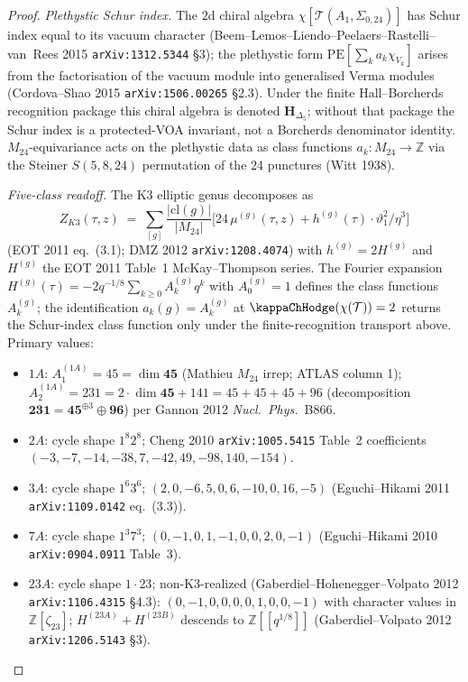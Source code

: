 \begin{proof}%
\emph{Plethystic Schur index.} The $2$d chiral algebra
$\chi[\mathcal T(A_1, \Sigma_{0, 24})]$ has Schur index equal to its
vacuum character
(Beem--Lemos--Liendo--Peelaers--Rastelli--van~Rees 2015
\texttt{arXiv:1312.5344} \S 3); the plethystic form
$\mathrm{PE}[\sum_k a_k \chi_{V_k}]$ arises from the
factorisation of the vacuum module into generalised Verma
modules (Cordova--Shao 2015 \texttt{arXiv:1506.00265} \S 2.3).
Under the finite Hall--Borcherds recognition package this chiral
algebra is denoted $\mathbf H_{\Delta_5}$; without that package the
Schur index is a protected-VOA invariant, not a Borcherds denominator
identity.
$M_{24}$-equivariance acts on the plethystic data as class
functions $a_k\colon M_{24} \to \mathbb Z$ via the Steiner
$S(5, 8, 24)$ permutation of the $24$ punctures (Witt 1938).

\emph{Five-class readoff.} The K3 elliptic genus decomposes as
\[
 Z_{K3}(\tau, z)
 \;=\; \sum_{[g]} \frac{|\mathrm{cl}(g)|}{|M_{24}|}
 \bigl[24\, \mu^{(g)}(\tau, z) + h^{(g)}(\tau) \cdot
 \vartheta_1^2 / \eta^3\bigr]
\]
(EOT 2011 eq.~(3.1); DMZ 2012 \texttt{arXiv:1208.4074}) with
$h^{(g)} = 2 H^{(g)}$ and $H^{(g)}$ the EOT 2011 Table~1
McKay--Thompson series. The Fourier expansion
$H^{(g)}(\tau) = -2 q^{-1/8} \sum_{k \ge 0} A_k^{(g)} q^k$
with $A_0^{(g)} = 1$ defines the class functions $A_k^{(g)}$;
the identification $a_k(g) = A_k^{(g)}$ at
$\kappaChHodge(\chi(\mathcal T)) = 2$ returns the
Schur-index class function only under the finite-recognition
transport above. Primary values:
\begin{itemize}
\item $1A$: $A_1^{(1A)} = 45 = \dim \mathbf{45}$ (Mathieu
$M_{24}$ irrep; ATLAS column 1);
$A_2^{(1A)} = 231 = 2 \cdot \dim \mathbf{45} + 141 = 45 + 45
+ 45 + 96$ (decomposition $\mathbf{231} = \mathbf{45}^{\oplus 3}
\oplus \mathbf{96}$) per Gannon 2012 \emph{Nucl.\ Phys.}~B866.
\item $2A$: cycle shape $1^8 2^8$; Cheng 2010
\texttt{arXiv:1005.5415} Table~2 coefficients
$(-3, -7, -14, -38, 7, -42, 49, -98, 140, -154)$.
\item $3A$: cycle shape $1^6 3^6$;
$(2, 0, -6, 5, 0, 6, -10, 0, 16, -5)$
(Eguchi--Hikami 2011 \texttt{arXiv:1109.0142} eq.~(3.3)).
\item $7A$: cycle shape $1^3 7^3$;
$(0, -1, 0, 1, -1, 0, 0, 2, 0, -1)$
(Eguchi--Hikami 2010 \texttt{arXiv:0904.0911} Table~3).
\item $23A$: cycle shape $1 \cdot 23$; non-K3-realized
(Gaberdiel--Hohenegger--Volpato 2012 \texttt{arXiv:1106.4315}
\S 4.3): $(0, -1, 0, 0, 0, 0, 1, 0, 0, -1)$ with character
values in $\mathbb Z[\zeta_{23}]$;
$H^{(23A)} + H^{(23B)}$ descends to $\mathbb Z[[q^{1/8}]]$
(Gaberdiel--Volpato 2012 \texttt{arXiv:1206.5143} \S 3).
\end{itemize}


\end{proof}
